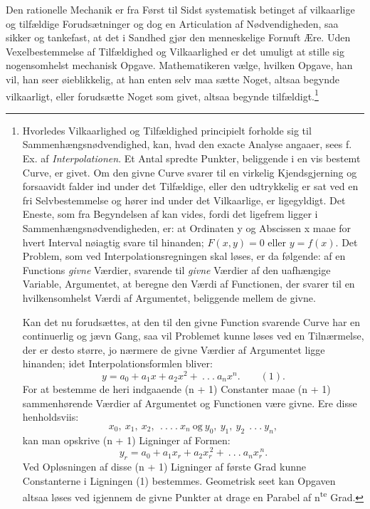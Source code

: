 \documentclass[12pt,a4paper]{book}
\begin{document}
Den rationelle Mechanik er fra Først til Sidst systematisk
betinget af vilkaarlige og tilfældige Forudsætninger og dog en
Articulation af Nødvendigheden, saa sikker og tankefast, at det i
Sandhed gjør den menneskelige Fornuft Ære. Uden
Vexelbestemmelse af Tilfældighed og Vilkaarlighed er det umuligt at stille
sig nogensomhelst mechanisk Opgave. Mathematikeren vælge,
hvilken Opgave, han vil, han seer øieblikkelig, at han enten selv
maa sætte Noget, altsaa begynde vilkaarligt, eller forudsætte
Noget som givet, altsaa begynde tilfældigt.\footnote{Hvorledes
Vilkaarlighed og Tilfældighed principielt forholde sig til
Sammenhængsnødvendighed, kan, hvad den exacte Analyse angaaer, sees
f. Ex. af \emph{Interpolationen}. Et Antal spredte Punkter,
beliggende i en vis bestemt Curve, er givet. Om den givne Curve
svarer til en virkelig Kjendsgjerning og forsaavidt falder ind
under det Tilfældige, eller den udtrykkelig er sat ved en fri
Selvbestemmelse og hører ind under det Vilkaarlige, er ligegyldigt.
Det Eneste, som fra Begyndelsen af kan vides, fordi det ligefrem
ligger i Sammenhængsnødvendigheden, er: at Ordinaten y og
Abscissen x maae for hvert Interval nøiagtig svare til hinanden;
$F(x,y) = 0$ eller $y = f(x)$. Det Problem, som ved
Interpolationsregningen skal løses, er da følgende: af en Functions
\emph{givne} Værdier, svarende til \emph{givne} Værdier af den
uafhængige Variable, Argumentet, at beregne den Værdi af
Functionen, der svarer til en hvilkensomhelst Værdi af Argumentet,
beliggende mellem de givne.

Kan det nu forudsættes, at den til den givne Function svarende
Curve har en continuerlig og jævn Gang, saa vil Problemet kunne
løses ved en Tilnærmelse, der er desto større, jo nærmere de
givne Værdier af Argumentet ligge hinanden; idet
Interpolationsformlen bliver:
\[
y = a_{0} + a_{1} x + a_{2} x^{2} + \ .\ .\ .\ a_{n} x^{n}. \qquad (1).
\]
For at bestemme de heri indgaaende (n + 1) Constanter maae
(n + 1) sammenhørende Værdier af Argumentet og Functionen
være givne. Ere disse henholdsviis:
\[
x_{0},\ x_{1},\ x_{2},\ \ .\ .\ .\ .\ x_{n}\ \text{og}\ y_{0},\ y_{1},\ y_{2}\ \ .\ .\ .\ y_{n},
\]
kan man opskrive (n + 1) Ligninger af Formen:
\[
y_{r} = a_{0} + a_{1} x_{r} + a_{2} x_{r}^{\,2} + \ .\ .\ .\ a_{n} x_{r}^{\,n}.
\]
Ved Opløsningen af disse (n + 1) Ligninger af første Grad kunne
Constanterne i Ligningen (1) bestemmes. Geometrisk seet kan
Opgaven altsaa løses ved igjennem de givne Punkter at drage en
Parabel af n\textsuperscript{te} Grad.

}
\end{document}
